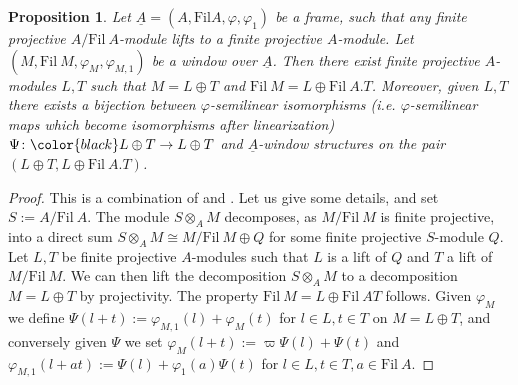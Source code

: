 \documentclass{amsart}
\theoremstyle{plain}
\newtheorem{proposition}[theorem]{Proposition}
\theoremstyle{definition}
\newcommand{\Fil}{\mathrm{Fil}}
\newcommand{\red}[1]{{\color{black} #1}}
\newcommand{\blue}[1]{{\color{black}#1}}
\begin{document}
\red{	
\begin{proposition}
  \label{sec:abstr-divid-prism-proposition-existence-of-normal-decompositions}
  Let $\underline{A}=(A,\Fil A, \varphi,\varphi_1)$ be a frame, such that any finite projective $A/\Fil~A$-module lifts to a finite projective $A$-module. Let $(M,\mathrm{Fil}~M,\varphi_M,\varphi_{M,1})$ be a window over $\underline{A}$. Then there exist finite projective $A$-modules $L,T$ such that $M=L\oplus T$ and $\mathrm{Fil}~M=L\oplus \Fil~A. T$. Moreover, given $L,T$ there exists a bijection between $\varphi$-semilinear isomorphisms (i.e. $\varphi$-semilinear maps which become isomorphisms after linearization) $\Psi\colon \blue{L}\oplus T \to L\oplus T$ and $\underline{A}$-window structures on the pair $(L\oplus T, L \oplus \Fil~A. T)$. 
\end{proposition}
\begin{proof}
  This is a combination of \cite[Remark 2.4]{lau_frames_and_finite_group_schemes_over_complete_regular_local_rings} and \cite[Lemma 2.5]{lau_frames_and_finite_group_schemes_over_complete_regular_local_rings}. Let us give some details, and set $S:=A/\Fil~A$. The module $S\otimes_{A}M$ decomposes, as $M/\mathrm{Fil}~M$ is finite projective, into a direct sum $S\otimes_{A}M\cong M/\mathrm{Fil}~M\oplus Q$ for some finite projective $S$-module $Q$. Let $L,T$ be finite projective $A$-modules such that $L$ is a lift of $Q$ and $T$ a lift of $M/\mathrm{Fil}~M$. We can then lift the decomposition $S\otimes_{A}M$ to a decomposition $M=L\oplus T$ by projectivity. The property $\mathrm{Fil}~M=L\oplus \Fil~A T$ follows. Given $\varphi_{M}$ we define $\Psi(l+t):=\varphi_{M,1}(l)+\varphi_M(t)$ for $l\in L, t\in T$ on $M=L\oplus T$, and conversely given $\Psi$ we set $\varphi_M(l+t):=\varpi \Psi(l)+\Psi(t)$ and $\varphi_{M,1}(l+at):=\Psi(l)+\varphi_1(a)\Psi(t)$ for $l\in L,t\in T,a\in \Fil~A$.
\end{proof}


}
\end{document}
